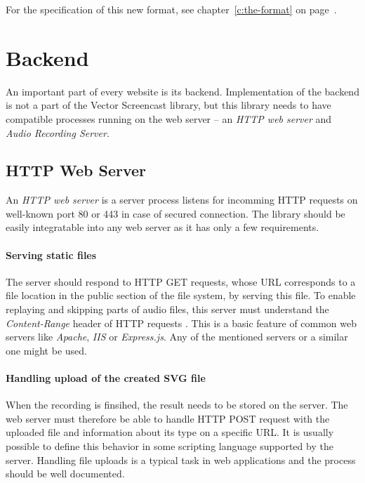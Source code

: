 For the specification of this new format, see chapter~\ref{c:the-format} on page~\pageref{c:the-format}.









\section{Backend}
An important part of every website is its backend. Implementation of the backend is not a part of the Vector Screencast library, but this library needs to have compatible processes running on the web server -- an \textit{HTTP web server} and \textit{Audio Recording Server}.

\subsection{HTTP Web Server}
An \textit{HTTP web server} is a server process listens for incomming HTTP requests on well-known port 80 or 443 in case of secured connection. The library should be easily integratable into any web server as it has only a few requirements.

\paragraph{Serving static files}
The server should respond to HTTP GET requests, whose URL corresponds to a file location in the public section of the file system, by serving this file. To enable replaying and skipping parts of audio files, this server must understand the \textit{Content-Range} header of HTTP requests \cite{content_range}. This is a basic feature of common web servers like \textit{Apache}, \textit{IIS} or \textit{Express.js}. Any of the mentioned servers or a similar one might be used.

\paragraph{Handling upload of the created SVG file}
When the recording is finsihed, the result needs to be stored on the server. The web server must therefore be able to handle HTTP POST request with the uploaded file and information about its type on a specific URL. It is usually possible to define this behavior in some scripting language supported by the server. Handling file uploads is a typical task in web applications and the process should be well documented.

